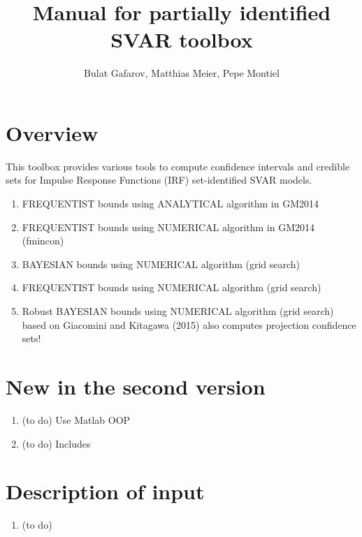 \documentclass{article}
\begin{document}
\title{Manual for partially identified SVAR toolbox}
\author{Bulat Gafarov, Matthias Meier, Pepe Montiel}

\maketitle

\section{Overview}
This toolbox provides various tools to compute confidence intervals and credible sets for Impulse Response Functions (IRF) set-identified SVAR models.
\begin{enumerate}
\item FREQUENTIST bounds using ANALYTICAL algorithm in GM2014 
\item FREQUENTIST bounds using NUMERICAL  algorithm in GM2014 (fmincon)
\item BAYESIAN    bounds using NUMERICAL  algorithm (grid search)
\item FREQUENTIST bounds using NUMERICAL  algorithm (grid search)
\item Robust BAYESIAN bounds using NUMERICAL  algorithm (grid search)    based on Giacomini and Kitagawa (2015)     also computes projection confidence sets!
\end{enumerate}


\section{New in the second version}
\begin {enumerate}
\item {\color{red} (to do)} Use Matlab OOP 
\item {\color{red} (to do)} Includes  
\end {enumerate}


\section{Description of input}
\begin {enumerate}
\item {\color{red} (to do)}  
 
\end {enumerate}
\end{document}
